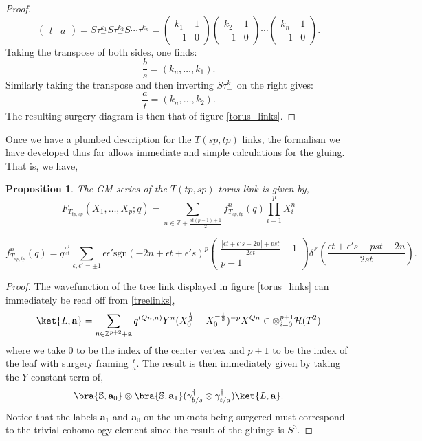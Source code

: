 \documentclass{article}
\newcommand{\Z}{{\mathbb Z}}
\newtheorem{proposition}{Proposition}[section]
\numberwithin{corollary}{theorem}
\numberwithin{corollary}{proposition}
\begin{document}
\begin{proof}
$$\begin{pmatrix}
    t&a
\end{pmatrix} = S\tau^{k_1}_-S\tau^{k_2}_-S\cdots\tau^{k_n} = \begin{pmatrix}
    k_1&1\\
    -1&0
\end{pmatrix}\begin{pmatrix}
    k_2&1\\
    -1&0
\end{pmatrix}\cdots\begin{pmatrix}
    k_n&1\\
    -1&0
\end{pmatrix} .$$
Taking the transpose of both sides, one finds:
$$\frac{b}{s} = (k_n,\ldots,k_1).$$
Similarly taking the transpose and then inverting $S\tau^{k_1}_-$ on the right gives:
$$\frac{a}{t} = (k_n,\ldots,k_2).$$
The resulting surgery diagram is then that of figure \ref{torus_links}.
\end{proof}

Once we have a plumbed description for the $T(sp,tp)$ links, the formalism we have developed thus far allows immediate and simple calculations for the gluing. That is, we have,
\begin{proposition}\label{toruslinksGM}
    The GM series of the $T(tp,sp)$ torus link is given by,
    $$F_{T_{tp,sp}}(X_1,\ldots,X_p;q) = \sum_{n\in \mathbb{Z}+\frac{st(p-1) +1}{2}} f^n_{T_{sp,tp}}(q) \prod^p_{i=1}X_i^n$$
    
    $$f^n_{T_{sp,tp}}(q) = q^{\frac{n^2}{st}}\sum_{\epsilon,\epsilon' = \pm1} \epsilon \epsilon' \mathrm{sgn}(-2n +\epsilon t +\epsilon' s )^p \begin{pmatrix}
        \frac{|\epsilon t+\epsilon' s -2n|+pst}{2st}-1\\
        p-1
    \end{pmatrix} \delta^\mathbb{Z}\left(\frac{\epsilon t+\epsilon' s+pst -2n}{2st}\right).$$
\end{proposition}
\begin{proof}
The wavefunction of the tree link displayed in figure \ref{torus_links} can immediately be read off from \eqref{treelinks},
$$\ket{L,\mathbf{a}} = \sum_{n\in \Z^{p+2}+\mathbf{a}} q^{(Qn,n)} Y^n (X_0^{\frac{1}{2}}-X_0^{-\frac{1}{2}})^{-p} X^{Qn} \in \otimes^{p+1}_{i=0}\mathcal{H}(T^2)$$
where we take $0$ to be the index of the center vertex and $p+1$ to be the index of the leaf with surgery framing $\frac{t}{a}$. The result is then immediately given by taking the $Y$ constant term of,
$$\bra{\mathbb{S},\mathbf{a}_0}\otimes\bra{\mathbb{S},\mathbf{a}_1} (\gamma^\dagger_{b/s}\otimes\gamma^\dagger_{t/a})\ket{L,\mathbf{a}}.$$
Notice that the labels $\mathbf{a}_1$ and $\mathbf{a}_0$ on the unknots being surgered must correspond to the trivial cohomology element since the result of the gluings is $S^3$.
\end{proof}
\end{document}

